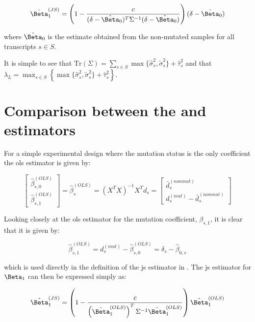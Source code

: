 \begin{equation}
  \hat{\Beta}_1^{(JS)} = \left( 1 - \frac{c}{(\delta - \hat{\Beta}_0)^T \Sigma^{-1} (\delta - \hat{\Beta}_0)} \right)(\delta - \hat{\Beta}_0)
  \label{eqn:js_defn}
\end{equation}

where $\hat{\Beta}_0$ is the estimate obtained from the non-mutated samples for all transcripts $s \in S$.

It is simple to see that $\text{Tr}(\Sigma) = \sum_{s \in S} \max\{ \hat{\sigma}_s^2, \tilde{\sigma}_s^2 \} + \hat{\tau}_s^2$ and that $\lambda_L = \max_{s \in S} \left\{ \max\{ \hat{\sigma}_s^2, \tilde{\sigma}_s^2 \} + \hat{\tau}_s^2 \right\}$.

\section{Comparison between the  and  estimators}

For a simple experimental design where the mutation status is the only coefficient the \gls{ols} estimator is given by:

\begin{equation*}
  \begin{bmatrix}
    \hat{\beta}_{s,0}^{(OLS)} \\
    \hat{\beta}_{s,1}^{(OLS)}
  \end{bmatrix}
  = \hat{\beta}_s^{(OLS)}
  = (X^TX)^{-1}X^T d_s
  = \begin{bmatrix}
    \bar{d}_s^{(nonmut)} \\
    d_s^{(mut)} - \bar{d}_s^{(nonmut)}
  \end{bmatrix}
\end{equation*}

Looking closely at the \gls{ols} estimator for the mutation coefficient, $\beta_{s,1}$, it is clear that it is given by:

\begin{equation}
  \hat{\beta}_{s,1}^{(OLS)} = d_s^{(mut)} - \hat{\beta}_{s,0}^{(OLS)} = \delta_s - \hat{\beta}_{0,s}
\end{equation}

which is used directly in the definition of the \gls{js} estimator in .
The \gls{js} estimator for $\Beta_1$ can then be expressed simply as:

\begin{equation}
  \hat{\Beta}_1^{(JS)} = \left( 1 - \frac{c}{\left( \hat{\Beta}_1^{(OLS)} \right)^T \Sigma^{-1} \hat{\Beta}_1^{(OLS)}} \right) \hat{\Beta}_1^{(OLS)}
  \label{eqn:js_defn_ols}
\end{equation}

